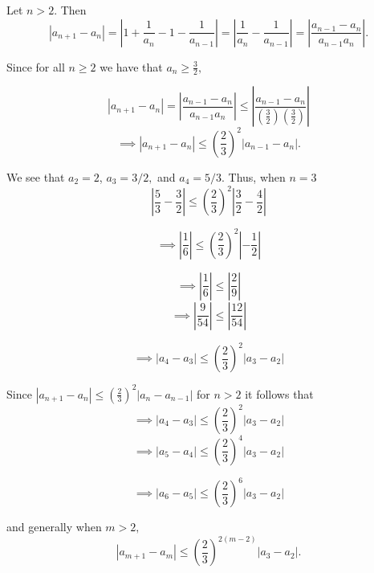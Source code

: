\documentclass{report}
\begin{document}
\begin{myproof}
    
Let $n>2$. Then $$ \left| a_{n+1}  - a_{n} \right| 
= \left| 1 + \frac{1}{a_{n}}  - 1 - \frac{1}{a_{n-1}} \right| = \left|\frac{1}{a_{n}}  - \frac{1}{a_{n-1}} \right| = \left|\frac{ a_{n-1 } - a_n }{a_{n-1} a_n}   \right|.$$

Since for all $n\geq2$ we have that $a_n \geq \frac{3}{2},$

$$ \left| a_{n+1}  - a_{n} \right| =\left|\frac{ a_{n-1 } - a_n }{a_{n-1} a_n}\right| \leq \left|\frac{ a_{n-1 } - a_n }{\left(\frac{3}{2}\right) \left(\frac{3}{2}\right)}\right|$$
$$ \implies \left| a_{n+1}  - a_{n} \right|  \leq \left(\frac{2}{3}\right)^2\left|a_{n-1 } - a_n \right|.$$

\end{myproof}

\pagebreak
{}

\sol
\begin{myproof}
    
We see that  $a_2 = 2$, $a_3 = 3/2,$ and $a_4 = 5/3$.  Thus, when $n=3$
$$\left|\frac{5}{3} - \frac{3}{2} \right| \leq \left(\frac{2}{3} \right)^2 \left|\frac{3}{2} - \frac{4}{2} \right|$$

$$\implies \left|\frac{1}{6}  \right| \leq \left(\frac{2}{3} \right)^2 \left| - \frac{1}{2} \right|$$

$$\implies \left|\frac{1}{6}  \right| \leq \left|\frac{2}{9} \right|$$
$$\implies \left|\frac{9}{54}  \right| \leq \left|\frac{12}{54} \right|$$

$$\implies \left|a_4 - a_3 \right| \leq \left(\frac{2}{3} \right)^2 \left|a_3 - a_2 \right|$$

Since $\left|a_{n+1}-a_n\right| \leq\left(\frac{2}{3}\right)^2\left|a_n-a_{n-1}\right|$ for $n>2$ it follows that
$$\implies \left|a_{4} - a_3\right| \leq \left(\frac{2}{3}\right)^2 \left|a_3 -a_2\right|$$
$$\implies \left|a_{5} - a_4\right| \leq \left(\frac{2}{3}\right)^4 \left|a_3 -a_2\right|$$

$$\implies \left|a_{6} - a_5\right| \leq \left(\frac{2}{3}\right)^6 \left|a_3 -a_2\right|$$

and generally when $m>2,$
$$ \left|a_{m+1} - a_m\right| \leq \left(\frac{2}{3}\right)^{2(m-2)} \left|a_3 -a_2\right|.$$

\end{myproof}
\pagebreak
{}
\end{document}
